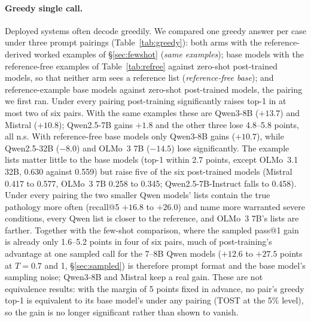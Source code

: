 \documentclass[wcp]{jmlr}
\begin{document}
\paragraph{Greedy single call.} Deployed systems often decode greedily. We compared one greedy answer per case under three prompt pairings (Table~\ref{tab:greedy}): both arms with the reference-derived worked examples of \S\ref{sec:fewshot} (\emph{same examples}); base models with the reference-free examples of Table~\ref{tab:refree} against zero-shot post-trained models, so that neither arm sees a reference list (\emph{reference-free base}); and reference-example base models against zero-shot post-trained models, the pairing we first ran. Under every pairing post-training significantly raises top-1 in at most two of six pairs. With the same examples these are Qwen3-8B ($+13.7$) and Mistral ($+10.8$); Qwen2.5-7B gains $+1.8$ and the other three lose 4.8--5.8 points, all n.s. With reference-free base models only Qwen3-8B gains ($+10.7$), while Qwen2.5-32B ($-8.0$) and OLMo~3 7B ($-14.5$) lose significantly. The example lists matter little to the base models (top-1 within 2.7 points, except OLMo~3.1 32B, 0.630 against 0.559) but raise five of the six post-trained models (Mistral 0.417 to 0.577, OLMo~3 7B 0.258 to 0.345; Qwen2.5-7B-Instruct falls to 0.458). Under every pairing the two smaller Qwen models' lists contain the true pathology more often (recall@5 $+16.8$ to $+26.0$) and name more warranted severe conditions, every Qwen list is closer to the reference, and OLMo~3 7B's lists are farther. Together with the few-shot comparison, where the sampled pass@1 gain is already only 1.6--5.2 points in four of six pairs, much of post-training's advantage at one sampled call for the 7--8B Qwen models ($+12.6$ to $+27.5$ points at $T{=}0.7$ and 1, \S\ref{sec:sampled}) is therefore prompt format and the base model's sampling noise; Qwen3-8B and Mistral keep a real gain. These are not equivalence results: with the margin of 5 points fixed in advance, no pair's greedy top-1 is equivalent to its base model's under any pairing (TOST at the 5\% level), so the gain is no longer significant rather than shown to vanish.
\end{document}
